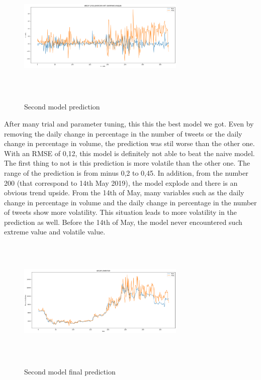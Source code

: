 \documentclass[conference]{IEEEtran}
\begin{document}
\begin{figure}[H]
\includegraphics[width=8cm, height=6cm]{M2_Final}
\label{fig}
\caption{Second model prediction}
\end{figure}

After many trial and parameter tuning, this this the best model we got. Even by removing the daily change in percentage in the number of tweets or the daily change in percentage in volume, the prediction was stil worse than the other one. With an RMSE of 0,12, this model is definitely  not able to beat the naive model.\newline
\newline
The first thing to not is this prediction is more volatile than the other one. The range of the prediction is from minus 0,2 to 0,45. In addition, from the number 200 (that correspond to 14th May 2019), the model explode and there is an obvious trend upside. \newline
\newline
From the 14th of May, many variables such as the daily change in percentage in volume and the daily change in percentage in the number of tweets show more volatility. This situation leads to more volatility in the prediction as well. Before the 14th of May, the model never encountered such extreme value and volatile value. 

\begin{figure}[H]
\includegraphics[width=8cm, height=6cm]{M2_Final_chart}
\label{fig}
\caption{Second model final prediction}
\end{figure}
\end{document}

